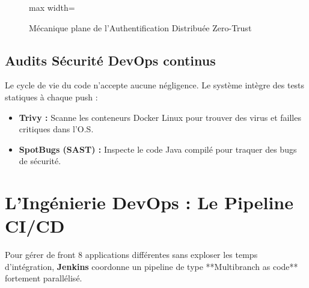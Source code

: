 \documentclass[12pt,a4paper]{article}
\begin{document}
\begin{figure}[H]
\begin{adjustbox}{max width=\textwidth}
    \end{adjustbox}
    \caption{Mécanique plane de l'Authentification Distribuée Zero-Trust}
\end{figure}

\subsection{Audits Sécurité DevOps continus}
Le cycle de vie du code n'accepte aucune négligence. Le système intègre des tests statiques à chaque push :
\begin{itemize}
    \item \textbf{Trivy :} Scanne les conteneurs Docker Linux pour trouver des virus et failles critiques dans l'O.S.
    \item \textbf{SpotBugs (SAST) :} Inspecte le code Java compilé pour traquer des bugs de sécurité.
\end{itemize}


\section{L'Ingénierie DevOps : Le Pipeline CI/CD}

Pour gérer de front 8 applications différentes sans exploser les temps d'intégration, \textbf{Jenkins} coordonne un pipeline de type **Multibranch as code** fortement parallélisé.
\end{document}

